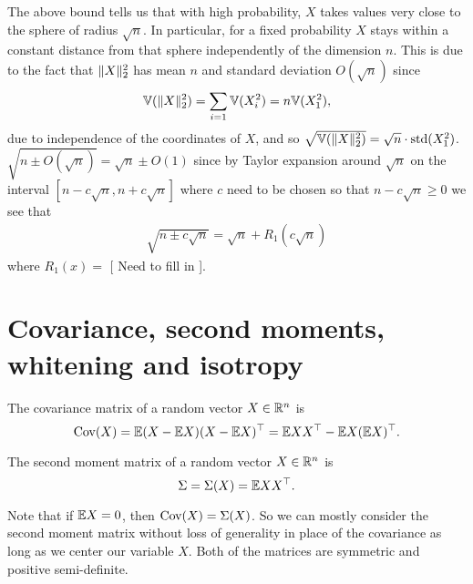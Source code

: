 \documentclass{article}
\begin{document}
\begin{remark}
  The above bound tells us that with high probability, \(X\) takes values very
  close to the sphere of radius \(\sqrt{n}\). In particular, for a fixed probability \(X\) stays
  within a constant distance from that sphere independently of the dimension
  \(n\). This is due to the fact that \(\lVert X\rVert_{2}^{2}\) has mean \(n\) and
  standard deviation \(O(\sqrt{n})\) since
  \begin{equation}
    \mathbb{V}(\lVert X\rVert_{2}^{2}) = \sum_{i=1}\mathbb{V}(X_{i}^{2}) = n \mathbb{V}(X_{1}^{2}),
  \end{equation}
  due to independence of the coordinates of \(X\), and so
  \(\sqrt{\mathbb{V}(\lVert X\rVert_{2}^{2})} = \sqrt{n} \cdot \mathrm{std}(X_{1}^{2})\).
  \(\sqrt{n \pm O(\sqrt{n})} = \sqrt{n} \pm O(1)\) since by Taylor expansion
  around \(\sqrt{n}\) on the interval \([n - c \sqrt{n}, n + c \sqrt{n}]\) where
  \(c\) need to be chosen so that \(n - c \sqrt{n} \geq 0\) we see that
  \begin{align}
    \sqrt{n \pm c\sqrt{n}} = \sqrt{n} + R_{1}(c\sqrt{n})
  \end{align}
  where \(R_{1}(x) = \) [ Need to fill in ].
\end{remark}

\section{Covariance, second moments, whitening and isotropy}
\begin{definition}
  The covariance matrix of a random vector \(X \in \mathbb{R}^{n}\) is
  \begin{equation}
    \mathrm{Cov}(X) = \mathbb{E}(X - \mathbb{E} X)(X - \mathbb{E} X)^\top = \mathbb{E} X X^\top - \mathbb{E} X (\mathbb{E} X)^\top.
  \end{equation}
\end{definition}

\begin{definition}
  The second moment matrix of a random vector \(X \in \mathbb{R}^{n}\) is
  \begin{equation}
  \Sigma = \Sigma(X) = \mathbb{E} X X^\top.
  \end{equation}
\end{definition}

Note that if \(\mathbb{E} X = 0\), then \(\mathrm{Cov}(X) = \Sigma(X)\). So we can mostly
consider the second moment matrix without loss of generality in place of the
covariance as long as we center our variable \(X\). Both of the matrices are
symmetric and positive semi-definite.
\end{document}
